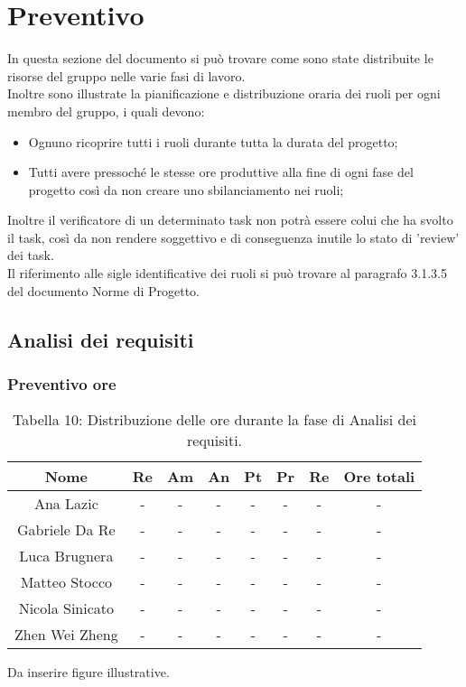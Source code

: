 \section{Preventivo}
In questa sezione del documento si può trovare come sono state distribuite le risorse del gruppo nelle varie fasi di lavoro.\\
Inoltre sono illustrate la pianificazione e distribuzione oraria dei ruoli per ogni membro del gruppo, i quali devono:
\begin{itemize}
	\item Ognuno ricoprire tutti i ruoli durante tutta la durata del progetto;
	\item Tutti avere pressoché le stesse ore produttive alla fine di ogni fase del progetto così da non creare uno sbilanciamento nei ruoli;
\end{itemize}
Inoltre il verificatore di un determinato task non potrà essere colui che ha svolto il task, così da non rendere soggettivo e di conseguenza inutile lo stato di 'review' dei task.\\
Il riferimento alle sigle identificative dei ruoli si può trovare al paragrafo 3.1.3.5 del documento Norme di Progetto.

\subsection{Analisi dei requisiti}
\subsubsection{Preventivo ore}
\begin{table}[h]
	\setlength\extrarowheight{5pt}
	\centering
	\begin{tabularx}{\textwidth}{|c|c|c|c|c|c|c|c|}
		\hline
		\textbf{Nome} & \textbf{Re} & \textbf{Am} & \textbf{An} & \textbf{Pt} & \textbf{Pr}& \textbf{Re} & \textbf{Ore totali}\\
		\hline
		Ana Lazic &-&-&-&-&-&-&- \\
		\hline
		Gabriele Da Re &-&-&-&-&-&-&- \\
		\hline
		Luca Brugnera &-&-&-&-&-&-&- \\
		\hline
		Matteo Stocco &-&-&-&-&-&-&- \\
		\hline
		Nicola Sinicato &-&-&-&-&-&-&- \\
		\hline
		Zhen Wei Zheng &-&-&-&-&-&-&- \\
		\hline
	\end{tabularx}
	\vspace{10pt}
	\caption{Tabella 10: Distribuzione delle ore durante la fase di Analisi dei requisiti.}
\end{table}
Da inserire figure illustrative.

